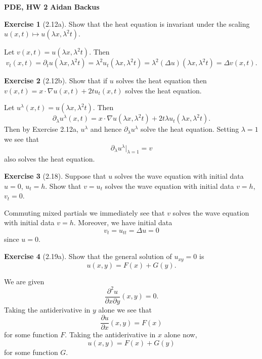 \documentclass[10pt]{article}
\theoremstyle{definition}
\newtheorem{exer}{Exercise}
\begin{document}
\noindent
\large\textbf{PDE, HW 2} \hfill \textbf{Aidan Backus} \\


\begin{exer}[2.12a]
Show that the heat equation is invariant under the scaling $u(x, t) \mapsto u(\lambda x, \lambda^2 t)$.
\end{exer}

Let $v(x, t) = u(\lambda x, \lambda^2 t)$. Then
$$v_t(x, t) = \partial_t u(\lambda x, \lambda^2 t) = \lambda^2 u_t(\lambda x, \lambda^2 t) = \lambda^2 (\Delta u)(\lambda x, \lambda^2 t) = \Delta v(x, t).$$

\begin{exer}[2.12b]
Show that if $u$ solves the heat equation then $v(x, t) = x \cdot \nabla u(x, t) + 2t u_t(x, t)$ solves the heat equation.
\end{exer}

Let $u^\lambda(x, t) = u(\lambda x, \lambda^2 t)$. Then
$$\partial_\lambda u^\lambda (x, t) = x \cdot \nabla u(\lambda x, \lambda^2 t) + 2t \lambda u_t(\lambda x, \lambda^2 t).$$
Then by Exercise 2.12a, $u^\lambda$ and hence $\partial_\lambda u^\lambda$ solve the heat equation.
Setting $\lambda = 1$ we see that
$$\partial_\lambda u^\lambda |_{\lambda = 1} = v$$
also solves the heat equation.

\begin{exer}[2.18]
Suppose that $u$ solves the wave equation with initial data $u = 0$, $u_t = h$.
Show that $v = u_t$ solves the wave equation with initial data $v = h$, $v_t = 0$.
\end{exer}

Commuting mixed partials we immediately see that $v$ solves the wave equation with initial data $v = h$.
Moreover, we have initial data
$$v_t = u_{tt} = \Delta u = 0$$
since $u = 0$.

\begin{exer}[2.19a]
Show that the general solution of $u_{xy} = 0$ is
$$u(x, y) = F(x) + G(y).$$
\end{exer}

We are given
$$\frac{\partial^2 u}{\partial x\partial y} (x, y) = 0.$$
Taking the antiderivative in $y$ alone we see that
$$\frac{\partial u}{\partial x} (x, y) = F(x)$$
for some function $F$. Taking the antiderivative in $x$ alone now,
$$u(x, y) = F(x) + G(y)$$
for some function $G$.
\end{document}
